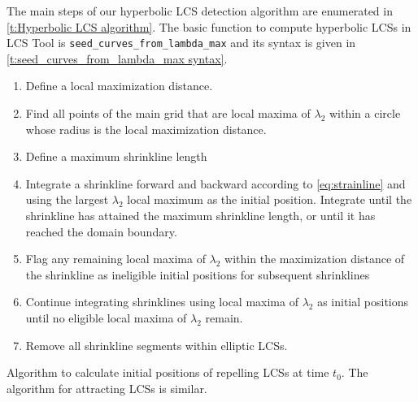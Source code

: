 \documentclass{elsarticle}
\begin{document}
The main steps of our hyperbolic LCS detection algorithm are enumerated in \cref{t:Hyperbolic LCS algorithm}. The basic function to compute hyperbolic LCSs in LCS Tool is \lstinline!seed_curves_from_lambda_max! and its syntax is given in \cref{t:seed_curves_from_lambda_max syntax}.

\begin{table}
\begin{enumerate}
\item Define a local maximization distance.
\item Find all points of the main grid that are local maxima of $\lambda_2$ within a circle whose radius is the local  maximization distance.
\item Define a maximum shrinkline length
\item Integrate a shrinkline forward and backward according to \cref{eq:strainline} and using the largest $\lambda_2$ local maximum as the initial position. Integrate until the shrinkline has attained the maximum shrinkline length, or until it has reached the domain boundary.
\item Flag any remaining local maxima of $\lambda_2$ within the maximization distance of the shrinkline as ineligible initial positions for subsequent shrinklines
\label{i:flag maxima}
\item Continue integrating shrinklines using local maxima of $\lambda_2$ as initial positions until no eligible local maxima of $\lambda_2$ remain.
\item Remove all shrinkline segments within elliptic LCSs.
\end{enumerate}
\caption{Algorithm to calculate initial positions of repelling LCSs at time $t_0$. The algorithm for attracting LCSs is similar.}
\label{t:Hyperbolic LCS algorithm}
\end{table}
\end{document}
